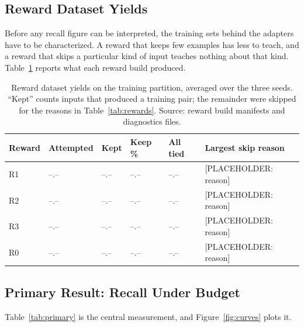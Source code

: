 \documentclass[12pt,letterpaper,oneside]{report}
\newcommand{\phnum}{\textcolor{phtext}{\textsf{\footnotesize --.--}}}
\newcommand{\ph}[1]{\textcolor{phtext}{[\textsf{\footnotesize PLACEHOLDER: #1}]}}
\newcommand{\Rz}{R0}
\newcommand{\Ra}{R1}
\newcommand{\Rb}{R2}
\newcommand{\Rc}{R3}
\newenvironment{tab}{\begingroup\singlespacing\small}{\endgroup}
\begin{document}
\subsection{Reward Dataset Yields}
\label{sec:results-yields}

Before any recall figure can be interpreted, the training sets behind the
adapters have to be characterized. A reward that keeps few examples has less to
teach, and a reward that skips a particular kind of input teaches nothing about
that kind. Table~\ref{tab:yields} reports what each reward build produced.

\begin{table}[htbp]
\caption[Reward dataset yields on the training partition]{Reward dataset yields on the training partition, averaged over the
three seeds. ``Kept'' counts inputs that produced a training pair; the
remainder were skipped for the reasons in Table~\ref{tab:rewards}. Source:
reward build manifests and diagnostics files.}
\label{tab:yields}
\centering
\begin{tab}
\begin{tabular}{@{}L{0.6in}R{0.78in}R{0.7in}R{0.65in}R{0.78in}R{1.05in}@{}}
\toprule
\textbf{Reward} & \textbf{Attempted} & \textbf{Kept} &
\textbf{Keep \%} & \textbf{All tied} & \textbf{Largest skip reason} \\
\midrule
\Ra & \phnum & \phnum & \phnum & \phnum & \ph{reason} \\
\Rb & \phnum & \phnum & \phnum & \phnum & \ph{reason} \\
\Rc & \phnum & \phnum & \phnum & \phnum & \ph{reason} \\
\Rz & \phnum & \phnum & \phnum & \phnum & \ph{reason} \\
\bottomrule
\end{tabular}
\end{tab}
\end{table}

\subsection{Primary Result: Recall Under Budget}
\label{sec:results-primary}

Table~\ref{tab:primary} is the central measurement, and
Figure~\ref{fig:curves} plots it.
\end{document}
